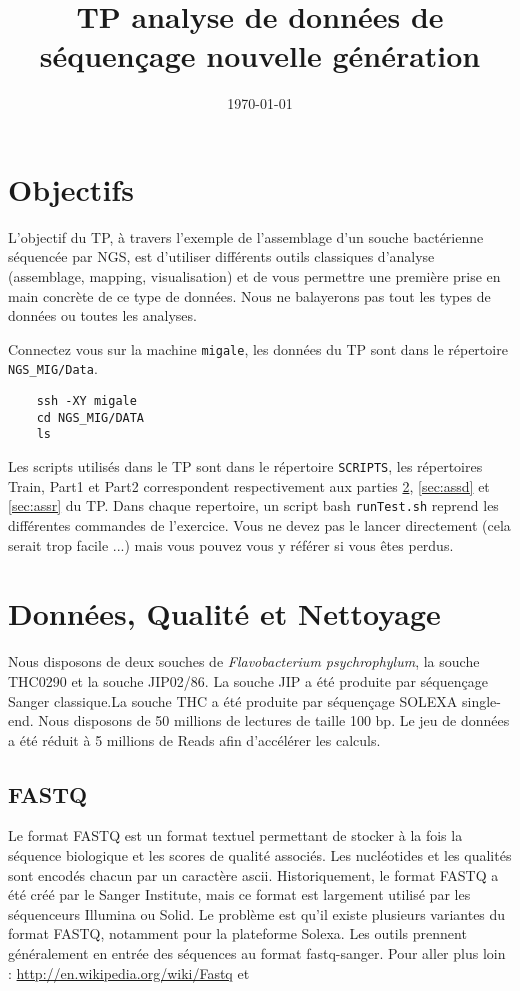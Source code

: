 \documentclass[a4paper,12pt]{article}
\title{TP analyse de données de séquençage nouvelle génération}
\date{\today}
\begin{document}
 

\maketitle 
\section{Objectifs} 
L'objectif du TP, à travers l'exemple de l'assemblage d'un souche bactérienne séquencée par NGS, est d'utiliser différents outils classiques d'analyse (assemblage, mapping, visualisation) et de vous permettre une première prise en main concrète de ce type de données. Nous ne balayerons pas tout les types de données ou toutes les analyses.

Connectez vous sur la machine \verb=migale=, les données du TP sont dans le répertoire \verb=NGS_MIG/Data=.
\begin{lstlisting}
	ssh -XY migale
	cd NGS_MIG/DATA
	ls
\end{lstlisting}



Les scripts utilisés dans le TP sont dans le répertoire \verb=SCRIPTS=, les répertoires Train, Part1 et Part2 correspondent respectivement aux parties \ref{sec:qual}, \ref{sec:assd} et \ref{sec:assr} du TP. Dans chaque repertoire, un script bash \verb=runTest.sh= reprend les différentes commandes de l'exercice. Vous ne devez pas le lancer directement (cela serait trop facile ...) mais vous pouvez vous y référer si vous êtes perdus. 

\section{Données, Qualité et Nettoyage}
\label{sec:qual}
Nous disposons de deux souches de \textit{Flavobacterium psychrophylum}, la souche THC0290 et la souche JIP02/86. La souche JIP a été produite par séquençage Sanger classique.La souche THC a été produite par séquençage SOLEXA single-end. Nous disposons de 50 millions de lectures de taille 100 bp. Le jeu de données a été réduit à 5 millions de Reads afin d'accélérer les calculs.

\subsection{FASTQ}
\label{sec:fastq}
Le format FASTQ est un format textuel permettant de stocker à la fois la séquence biologique et les scores de qualité associés. Les nucléotides et les qualités sont encodés chacun par un caractère ascii. Historiquement, le format FASTQ a été créé par le Sanger Institute, mais ce format est largement utilisé par les séquenceurs Illumina ou Solid. Le problème est qu'il existe plusieurs variantes du format FASTQ, notamment pour la plateforme Solexa. Les outils prennent généralement en entrée des séquences au format fastq-sanger.
Pour aller plus loin : \url{http://en.wikipedia.org/wiki/Fastq} et \cite{Cock:2009p1945} 
\end{document}
